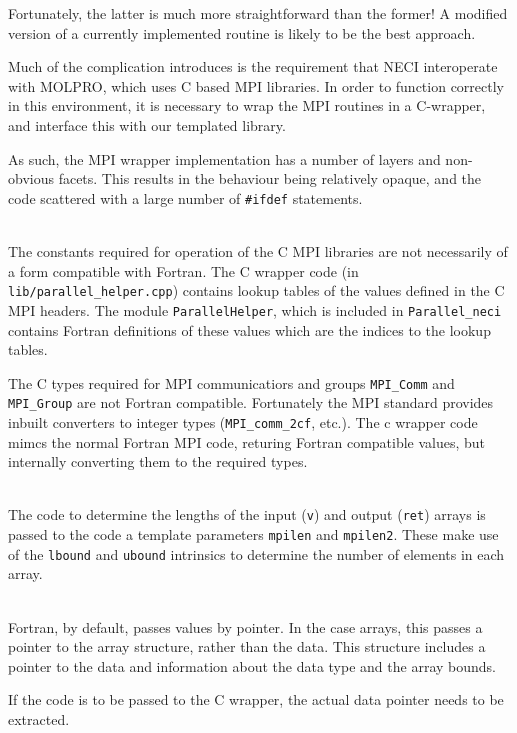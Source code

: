\documentclass[a4paper,notitlepage]{scrreprt}
\newcommand\headitem[1]{\needspace{1.5\baselineskip}\item[{\boldmath #1 \nopagebreak}] \hfill \\ \nopagebreak}
\let\code\lstinline
\begin{document}
{{{	Fortunately, the latter is much more straightforward than the former!
	A modified version of a currently implemented routine is likely to be
	the best approach.
	
	Much of the complication introduces is the requirement that NECI
	interoperate with MOLPRO, which uses C based MPI libraries. In order
	to function correctly in this environment, it is necessary to wrap
	the MPI routines in a C-wrapper, and interface this with our
	templated library.
	
	As such, the MPI wrapper implementation has a number of layers and
	non-obvious facets. This results in the behaviour being relatively
	opaque, and the code scattered with a large number of \code{#ifdef}
	statements.
	\begin{description}
		\headitem{C-wrapper initialisation}
			The constants required for operation of the C MPI
			libraries are not necessarily of a form compatible with
			Fortran. The C wrapper code (in
			\code{lib/parallel_helper.cpp}) contains lookup tables of
			the values defined in the C MPI headers. The module
			\code{ParallelHelper}, which is included in
			\code{Parallel_neci} contains Fortran definitions of these
			values which are the indices to the lookup tables.
			
			The C types required for MPI communicatiors and groups
			\code{MPI_Comm} and \code{MPI_Group} are not Fortran
			compatible. Fortunately the MPI standard provides inbuilt
			converters to integer types (\code{MPI_comm_2cf}, etc.).
			The c wrapper code mimcs the normal Fortran MPI
			code, returing Fortran compatible values, but internally
			converting them to the required types.
		
		
		\headitem{Determination of parameter sizes}
			The code to determine the lengths of the input (\code{v})
			and output (\code{ret}) arrays is passed to the code a
			template parameters \code{mpilen} and \code{mpilen2}. These
			make use of the \code{lbound} and \code{ubound} intrinsics
			to determine the number of elements in each array.
			
		\headitem{Conversion to pointers}
			Fortran, by default, passes values by pointer. In the case
			arrays, this passes a pointer to the array structure, rather
			than the data. This structure includes a pointer to the data
			and information about the data type and the array bounds.
			
			If the code is to be passed to the C wrapper, the actual
			data pointer needs to be extracted.
			

\end{description}}}}
\end{document}
